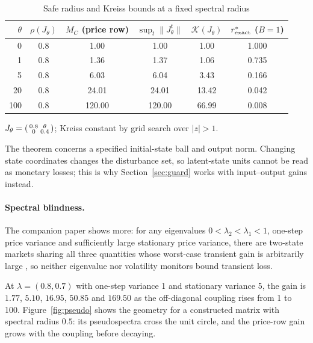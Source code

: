 \begin{table}[t]\centering\small
\begin{threeparttable}
\caption{Safe radius and Kreiss bounds at a fixed spectral radius}\label{tab:kreiss}
\begin{tabular}{rccccc}
\toprule
$\theta$ & $\rho(J_\theta)$ & $M_C$ (price row) & $\sup_t\|J_\theta^t\|$ & $\mathcal K(J_\theta)$ & $r^*_{\rm exact}$ ($B=1$)\\
\midrule
0 & 0.8 & 1.00 & 1.00 & 1.00 & 1.000\\
1 & 0.8 & 1.36 & 1.37 & 1.06 & 0.735\\
5 & 0.8 & 6.03 & 6.04 & 3.43 & 0.166\\
20 & 0.8 & 24.01 & 24.01 & 13.42 & 0.042\\
100 & 0.8 & 120.00 & 120.00 & 66.99 & 0.008\\
\bottomrule
\end{tabular}
\begin{tablenotes}\footnotesize\item $J_\theta=\begin{psmallmatrix}0.8&\theta\\0&0.4\end{psmallmatrix}$; Kreiss constant by grid search over $|z|>1$. \end{tablenotes}
\end{threeparttable}
\end{table}

The theorem concerns a specified initial-state ball and output norm. Changing state coordinates changes the disturbance set, so latent-state units cannot be read as monetary losses; this is why Section~\ref{sec:guard} works with input--output gains instead.

\paragraph{Spectral blindness.} The companion paper shows more: for any eigenvalues $0<\lambda_2<\lambda_1<1$, one-step price variance and sufficiently large stationary price variance, there are two-state markets sharing all three quantities whose worst-case transient gain is arbitrarily large \citep[spectral-blindness theorem]{niroula2026}, so neither eigenvalue nor volatility monitors bound transient loss.

At $\lambda=(0.8,0.7)$ with one-step variance 1 and stationary variance 5, the gain is $1.77$, $5.10$, $16.95$, $50.85$ and $169.50$ as the off-diagonal coupling rises from 1 to 100. Figure~\ref{fig:pseudo} shows the geometry for a constructed matrix with spectral radius $0.5$: its pseudospectra cross the unit circle, and the price-row gain grows with the coupling before decaying.

